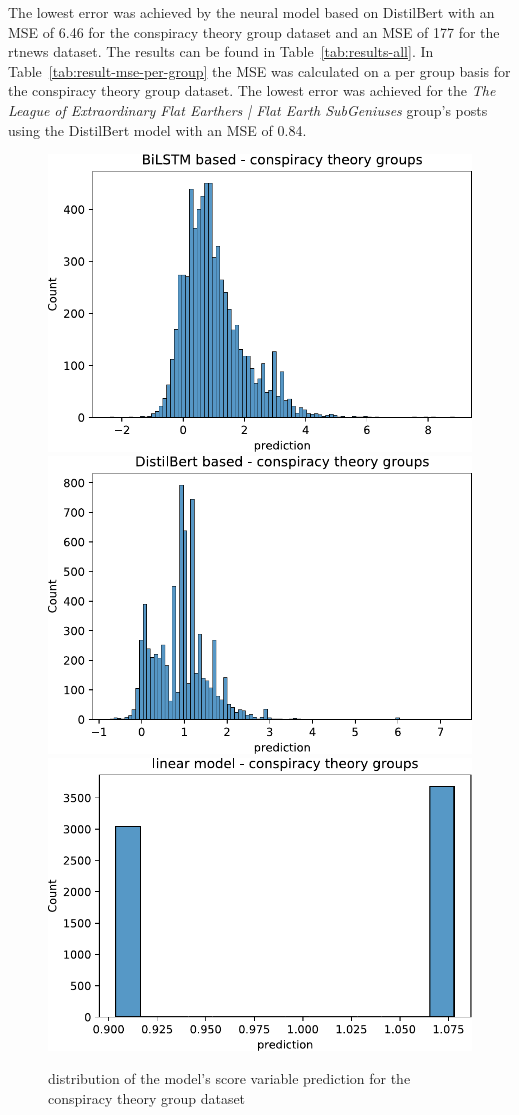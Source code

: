 The lowest error was achieved by the neural model based on DistilBert with an MSE of 6.46
for the conspiracy theory group dataset and an MSE of 177 for the rtnews dataset. The 
results can be found in Table~\ref{tab:results-all}. In
Table~\ref{tab:result-mse-per-group} the MSE was calculated on a per group basis for the
conspiracy theory group dataset. The lowest error was achieved for the \emph{The League of
Extraordinary Flat Earthers | Flat Earth SubGeniuses} group's posts using the DistilBert
model with an MSE of 0.84.
\begin{figure}[tb]
    \centering
    \includegraphics[width=.33\textwidth]{figures/prediction_groups/bilstm_dist.pdf}
    \includegraphics[width=.32\textwidth]{figures/prediction_groups/distil_bert_dist.pdf}
    \includegraphics[width=.33\textwidth]{figures/prediction_groups/linear_model_prediction_dist.pdf}
    \caption{distribution of the model's score variable prediction for the conspiracy theory group dataset}
    \label{fig:dist-prediction-groups}
\end{figure}
